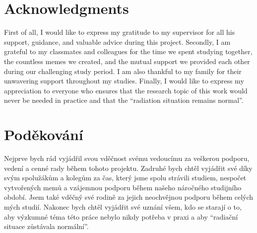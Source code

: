
\section*{Acknowledgments}
First of all, I would like to express my gratitude to my supervisor for all his support, guidance, and valuable advice during this project.
Secondly, I am grateful to my classmates and colleagues for the time we spent studying together, the countless memes we created, and the mutual support we provided each other during our challenging study period.
I am also thankful to my family for their unwavering support throughout my studies.
Finally, I would like to express my appreciation to everyone who ensures that the research topic of this work would never be needed in practice 
and that the ``radiation situation remains normal''.

\vspace{2.5cm}








\section*{Poděkování}
Nejprve bych rád vyjádřil svou vděčnost svému vedoucímu za veškerou podporu, vedení a cenné rady během tohoto projektu. 
Zadruhé bych chtěl vyjádřit své díky svým spolužákům a kolegům za čas, který jsme spolu strávili studiem, nespočet vytvořených memů a vzájemnou podporu během našeho náročného studijního období. 
Jsem také vděčný své rodině za jejich neochvějnou podporu během celých mých studií. 
Nakonec bych chtěl vyjádřit své uznání všem, kdo se starají o to, 
aby výzkumné téma této práce nebylo nikdy potřeba v praxi a aby ``radiační situace zůstávala normální''.


